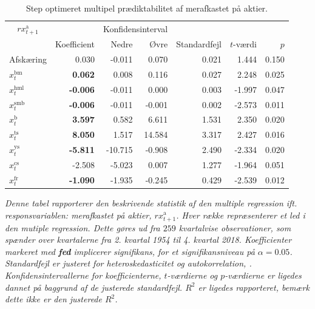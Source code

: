 \documentclass[
  a4paper,
  oneside]{memoir}
\begin{document}
\begin{table}[H]

\caption{\label{tab:MULT-step-ak}Step optimeret multipel prædiktabilitet af merafkastet på aktier.}
\centering
\begin{threeparttable}
\begin{tabular}[t]{lrrrrrr}
\toprule
\multicolumn{1}{c}{$rx_{t+1}^{\text{a}}$} & \multicolumn{1}{c}{ } & \multicolumn{2}{c}{Konfidensinterval} & \multicolumn{3}{c}{ } \\
\cmidrule(l{3pt}r{3pt}){1-1} \cmidrule(l{3pt}r{3pt}){3-4}
  & Koefficient & Nedre & Øvre & Standardfejl & $t$-værdi & $p$\\
\midrule
\rowcolor{gray!6}  Afskæring & 0.030 & -0.011 & 0.070 & 0.021 & 1.444 & 0.150\\
$x_t^{\text{bm}}$ & \textbf{ 0.062} & 0.008 & 0.116 & 0.027 & 2.248 & 0.025\\
\rowcolor{gray!6}  $x_t^{\text{hml}}$ & \textbf{-0.006} & -0.011 & 0.000 & 0.003 & -1.997 & 0.047\\
$x_t^{\text{smb}}$ & \textbf{-0.006} & -0.011 & -0.001 & 0.002 & -2.573 & 0.011\\
\rowcolor{gray!6}  $x_t^{\text{b}}$ & \textbf{ 3.597} & 0.582 & 6.611 & 1.531 & 2.350 & 0.020\\
$x_t^{\text{ts}}$ & \textbf{ 8.050} & 1.517 & 14.584 & 3.317 & 2.427 & 0.016\\
\rowcolor{gray!6}  $x_t^{\text{ys}}$ & \textbf{-5.811} & -10.715 & -0.908 & 2.490 & -2.334 & 0.020\\
$x_t^{\text{cs}}$ & -2.508 & -5.023 & 0.007 & 1.277 & -1.964 & 0.051\\
\rowcolor{gray!6}  $x_t^{\text{fr}}$ & \textbf{-1.090} & -1.935 & -0.245 & 0.429 & -2.539 & 0.012\\
\bottomrule
\end{tabular}
\begin{tablenotes}
\item \textit{Denne tabel rapporterer den beskrivende statistik af den multiple regression ift. responsvariablen: merafkastet på aktier, $rx_{t+1}^{\text{a}}$. Hver række repræsenterer et led i den mutiple regression. Dette gøres ud fra $259$ kvartalvise observationer, som spænder over kvartalerne fra 2. kvartal 1954 til 4. kvartal 2018. Koefficienter markeret med \textbf{fed} implicerer signifikans, for et signifikansniveau på $\alpha=0.05$. Standardfejl er justeret for heteroskedasticitet og autokorrelation, \citep{Newey1987}. Konfidensintervallerne for koefficienterne, $t$-værdierne og $p$-værdierne er ligedes dannet på baggrund af de justerede standardfejl. $R^2$ er ligedes rapporteret, bemærk dette ikke er den justerede $R^2$.}
\end{tablenotes}
\end{threeparttable}
\end{table}
\end{document}
